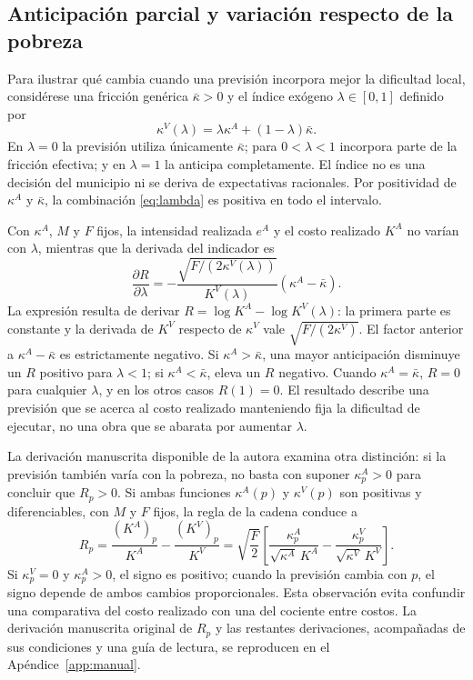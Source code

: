 \documentclass[11pt]{article}
\newcommand{\KA}{K^{A}}
\newcommand{\KV}{K^{V}}
\newcommand{\kA}{\kappa^{A}}
\newcommand{\kV}{\kappa^{V}}
\begin{document}
\subsection{Anticipación parcial y variación respecto de la pobreza}\label{sec:anticipacion}
Para ilustrar qué cambia cuando una previsión incorpora mejor la dificultad local, considérese una fricción genérica $\bar\kappa>0$ y el índice exógeno $\lambda\in[0,1]$ definido por
\begin{equation}\label{eq:lambda}
 \kV(\lambda)=\lambda\kA+(1-\lambda)\bar\kappa.
\end{equation}
En $\lambda=0$ la previsión utiliza únicamente $\bar\kappa$; para $0<\lambda<1$ incorpora parte de la fricción efectiva; y en $\lambda=1$ la anticipa completamente. El índice no es una decisión del municipio ni se deriva de expectativas racionales. Por positividad de $\kA$ y $\bar\kappa$, la combinación \eqref{eq:lambda} es positiva en todo el intervalo.

Con $\kA$, $M$ y $F$ fijos, la intensidad realizada $e^A$ y el costo realizado $\KA$ no varían con $\lambda$, mientras que la derivada del indicador es
\begin{equation}\label{eq:r_lambda}
 \frac{\partial R}{\partial\lambda}
 =-\frac{\sqrt{F/(2\kV(\lambda))}}{\KV(\lambda)}
   (\kA-\bar\kappa).
\end{equation}
La expresión resulta de derivar $R=\log\KA-\log\KV(\lambda)$: la primera parte es constante y la derivada de $\KV$ respecto de $\kV$ vale $\sqrt{F/(2\kV)}$. El factor anterior a $\kA-\bar\kappa$ es estrictamente negativo. Si $\kA>\bar\kappa$, una mayor anticipación disminuye un $R$ positivo para $\lambda<1$; si $\kA<\bar\kappa$, eleva un $R$ negativo. Cuando $\kA=\bar\kappa$, $R=0$ para cualquier $\lambda$, y en los otros casos $R(1)=0$. El resultado describe una previsión que se acerca al costo realizado manteniendo fija la dificultad de ejecutar, no una obra que se abarata por aumentar $\lambda$.

La derivación manuscrita disponible de la autora examina otra distinción: si la previsión también varía con la pobreza, no basta con suponer $\kappa_p^A>0$ para concluir que $R_p>0$. Si ambas funciones $\kA(p)$ y $\kV(p)$ son positivas y diferenciables, con $M$ y $F$ fijos, la regla de la cadena conduce a
\begin{equation}\label{eq:rp}
 R_p=\frac{(\KA)_p}{\KA}-\frac{(\KV)_p}{\KV}
 =\sqrt{\frac F2}\left[
 \frac{\kappa_p^A}{\sqrt{\kA}\,\KA}
 -\frac{\kappa_p^V}{\sqrt{\kV}\,\KV}\right].
\end{equation}
Si $\kappa_p^V=0$ y $\kappa_p^A>0$, el signo es positivo; cuando la previsión cambia con $p$, el signo depende de ambos cambios proporcionales. Esta observación evita confundir una comparativa del costo realizado con una del cociente entre costos. La derivación manuscrita original de $R_p$ y las restantes derivaciones, acompañadas de sus condiciones y una guía de lectura, se reproducen en el Apéndice~\ref{app:manual}.
\end{document}
